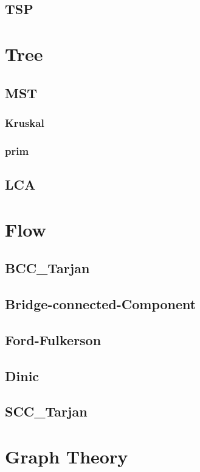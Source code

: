 	\subsection{TSP}
		
\section{Tree}
	\subsection{MST}
        \subsubsection{Kruskal}
            
        \subsubsection{prim}
            
	\subsection{LCA}
		
\section{Flow}
	\subsection{BCC\_Tarjan}
		
	\subsection{Bridge-connected-Component}
		
	\subsection{Ford-Fulkerson}
		
	\subsection{Dinic}
		
	\subsection{SCC\_Tarjan}
		
\section{Graph Theory}
